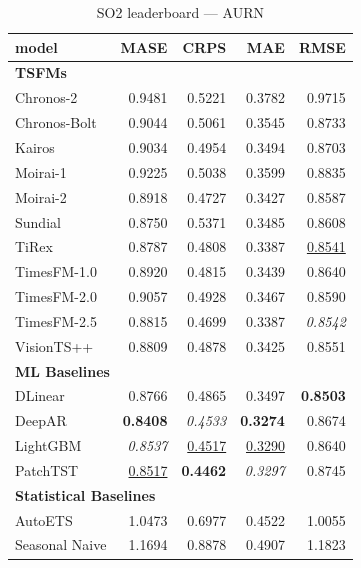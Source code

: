 \begin{table}[H]
\caption{SO2 leaderboard --- AURN}
\centering
\begin{small}
\begin{tabular}{lrrrr}
\toprule
model & MASE & CRPS & MAE & RMSE \\
\midrule
\multicolumn{5}{l}{\textbf{TSFMs}} \\
Chronos-2 & 0.9481 & 0.5221 & 0.3782 & 0.9715 \\
Chronos-Bolt & 0.9044 & 0.5061 & 0.3545 & 0.8733 \\
Kairos & 0.9034 & 0.4954 & 0.3494 & 0.8703 \\
Moirai-1 & 0.9225 & 0.5038 & 0.3599 & 0.8835 \\
Moirai-2 & 0.8918 & 0.4727 & 0.3427 & 0.8587 \\
Sundial & 0.8750 & 0.5371 & 0.3485 & 0.8608 \\
TiRex & 0.8787 & 0.4808 & 0.3387 & \underline{0.8541} \\
TimesFM-1.0 & 0.8920 & 0.4815 & 0.3439 & 0.8640 \\
TimesFM-2.0 & 0.9057 & 0.4928 & 0.3467 & 0.8590 \\
TimesFM-2.5 & 0.8815 & 0.4699 & 0.3387 & \textit{0.8542} \\
VisionTS++ & 0.8809 & 0.4878 & 0.3425 & 0.8551 \\
\midrule
\multicolumn{5}{l}{\textbf{ML Baselines}} \\
DLinear & 0.8766 & 0.4865 & 0.3497 & \textbf{0.8503} \\
DeepAR & \textbf{0.8408} & \textit{0.4533} & \textbf{0.3274} & 0.8674 \\
LightGBM & \textit{0.8537} & \underline{0.4517} & \underline{0.3290} & 0.8640 \\
PatchTST & \underline{0.8517} & \textbf{0.4462} & \textit{0.3297} & 0.8745 \\
\midrule
\multicolumn{5}{l}{\textbf{Statistical Baselines}} \\
AutoETS & 1.0473 & 0.6977 & 0.4522 & 1.0055 \\
Seasonal Naive & 1.1694 & 0.8878 & 0.4907 & 1.1823 \\
\bottomrule
\end{tabular}
\end{small}
\end{table}